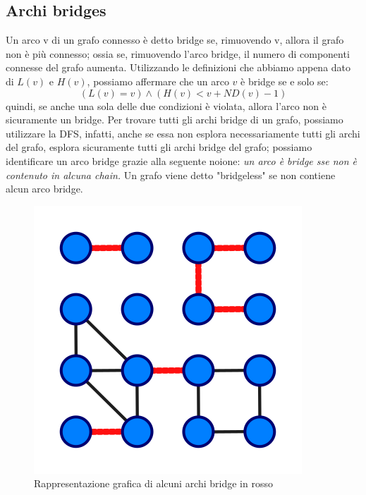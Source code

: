 \documentclass[12pt,a4paper]{article}
\begin{document}
\subsection{Archi bridges}
Un arco v di un grafo connesso è detto bridge se, rimuovendo v, allora il grafo non è più connesso; ossia se, rimuovendo l'arco bridge, il numero di componenti connesse del grafo aumenta. Utilizzando le definizioni che abbiamo appena dato di $L(v)$ e $H(v)$, possiamo affermare che un arco $v$ è bridge se e solo se: $$( L(v) = v ) \wedge ( H(v) < v + ND(v) - 1 )$$ quindi, se anche una sola delle due condizioni è violata, allora l'arco non è sicuramente un bridge. Per trovare tutti gli archi bridge di un grafo, possiamo utilizzare la DFS, infatti, anche se essa non esplora necessariamente tutti gli archi del grafo, esplora sicuramente tutti gli archi bridge del grafo; possiamo identificare un arco bridge grazie alla seguente noione: \textit{un arco è bridge sse non è contenuto in alcuna chain.} Un grafo viene detto "bridgeless" se non contiene alcun arco bridge.
\begin{figure}[h]
	\centering
	\includegraphics[width=0.5\linewidth]{img/Graph_cut_edges.svg.png}
	\caption{Rappresentazione grafica di alcuni archi bridge in rosso}
	\label{fig:1}
\end{figure}
\end{document}
